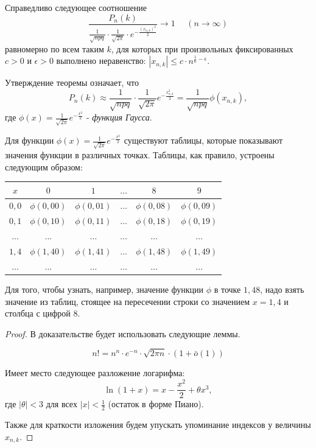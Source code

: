 \begin{theorem}
	Справедливо следующее соотношение
	\[ \dfrac{P_n(k)}{\frac{1}{\sqrt{npq}} \cdot \frac{1}{\sqrt{2 \pi}} \cdot e^{- \frac{(x_{n, k})^2}{2}}} \to 1 ~~~~~~ (n \to \infty) \]
	равномерно по всем таким $k$, для которых при произвольных фиксированных $c > 0$ и $\epsilon > 0$ выполнено неравенство: $|x_{n, k}| \le c \cdot n^{\frac{1}{6} - \epsilon}$.
	
	Утверждение теоремы означает, что
	\[ P_n(k) \approx \frac{1}{\sqrt{npq}} \cdot \frac{1}{\sqrt{2 \pi}} e^{-\frac{x_{n,k}^2}{2}} = \frac{1}{\sqrt{npq}} \phi (x_{n, k}), \]
	где $\phi(x) = \frac{1}{\sqrt{2 \pi}} e^{- \frac{x^2}{2}}$ - \textit{функция Гаусса}.
	
	Для функции $\phi (x) = \frac{1}{\sqrt{2 \pi}} e^{-\frac{x^2}{2}}$ существуют таблицы, которые показывают значения функции в различных точках. Таблицы, как правило, устроены следующим образом:
	\begin{table}[H]
		\centering
		\begin{tabular}{|c|c|c|c|c|c|}
			\hline
			$x$     & $0$           & $1$           & $\dots$ & $8$           & $9$           \\ \hline
			$0, 0$  & $\phi(0, 00)$ & $\phi(0, 01)$ & $\dots$ & $\phi(0, 08)$ & $\phi(0, 09)$ \\ \hline
			$0, 1$  & $\phi(0, 10)$ & $\phi(0, 11)$ & $\dots$ & $\phi(0, 18)$ & $\phi(0, 19)$ \\ \hline
			$\dots$ & $\dots$       & $\dots$       & $\dots$ & $\dots$       & $\dots$       \\ \hline
			$1, 4$  & $\phi(1, 40)$ & $\phi(1, 41)$ & $\dots$ & $\phi(1, 48)$ & $\phi(1, 49)$ \\ \hline
			$\dots$ & $\dots$       & $\dots$       & $\dots$ & $\dots$       & $\dots$       \\ \hline
		\end{tabular}
	\end{table}
	Для того, чтобы узнать, например, значение функции $\phi$ в точке $1, 48$, надо взять значение из таблиц, стоящее на пересечении строки со значением $x = 1,4$ и столбца с цифрой 8.
	
	\begin{proof}
		В доказательстве будет использовать следующие леммы.
		\begin{lemma}
			\[ n! = n^n \cdot e^{-n} \cdot \sqrt{2 \pi n} \cdot (1 + \bar o(1)) \]
		\end{lemma}
		\begin{lemma}
			Имеет место следующее разложение логарифма:
			\[ \ln (1 + x) = x - \frac{x^2}{2} + \theta x^3, \]
			где $|\theta| < 3$ для всех $|x| < \frac{1}{2}$ (остаток в форме Пиано).
		\end{lemma}
		Также для краткости изложения будем упускать упоминание индексов у величины $x_{n, k}$.
			

\end{proof}
\end{theorem}
